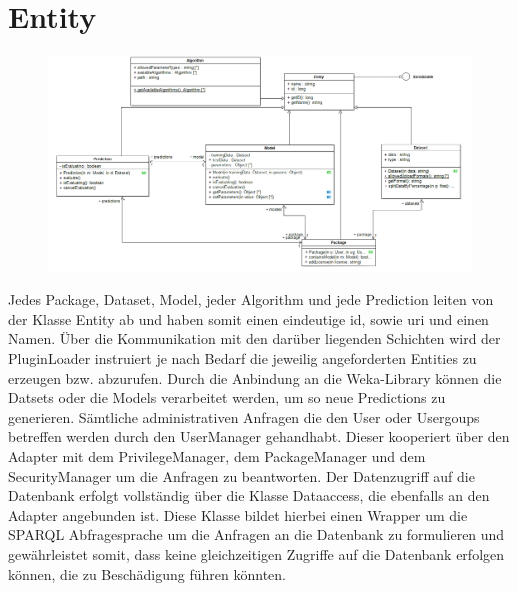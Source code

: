 \section{Entity}

\begin{figure}[h]
\centering
\includegraphics[width=1.0\linewidth]{Grafik/Klassendiagramme/Entity.png}
\end{figure}

Jedes Package, Dataset, Model, jeder Algorithm und jede Prediction leiten von der Klasse Entity ab und haben somit einen eindeutige id, sowie uri und einen Namen. Über die Kommunikation mit den darüber liegenden Schichten wird der PluginLoader instruiert je nach Bedarf die jeweilig angeforderten Entities zu erzeugen bzw. abzurufen. Durch die Anbindung an die Weka-Library können die Datsets oder die Models verarbeitet werden, um so neue Predictions zu generieren.
Sämtliche administrativen Anfragen die den User oder Usergoups betreffen werden durch den UserManager gehandhabt. Dieser kooperiert über den Adapter mit dem PrivilegeManager, dem PackageManager und dem SecurityManager um die Anfragen zu beantworten.
Der Datenzugriff auf die Datenbank erfolgt vollständig über die Klasse Dataaccess, die ebenfalls an den Adapter angebunden ist. Diese Klasse bildet hierbei einen Wrapper um die SPARQL Abfragesprache um die Anfragen an die Datenbank zu formulieren und gewährleistet somit, dass keine gleichzeitigen Zugriffe auf die Datenbank erfolgen können, die zu Beschädigung führen könnten.